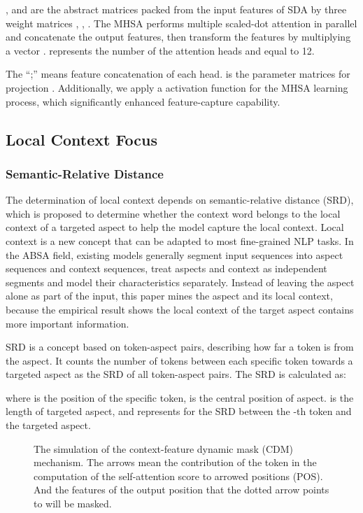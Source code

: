 \documentclass[a4paper,fleqn]{cas-sc}
\begin{document}
,  and  are the abstract matrices packed from the input features of SDA by three weight matrices , , . The MHSA performs multiple scaled-dot attention in parallel and concatenate the output features, then transform the features by multiplying a vector .  represents the number of the attention heads and equal to 12. 

The ``;'' means feature concatenation of each head.  is the parameter matrices for projection . Additionally, we apply a  activation function for the MHSA learning process, which significantly enhanced feature-capture capability.


\subsection{Local Context Focus}

\subsubsection{Semantic-Relative Distance}
\label{sec:SRD}

The determination of local context depends on semantic-relative distance (SRD), which is proposed to determine whether the context word belongs to the local context of a targeted aspect to help the model capture the local context. Local context is a new concept that can be adapted to most fine-grained NLP tasks. In the ABSA field, existing models generally segment input sequences into aspect sequences and context sequences, treat aspects and context as independent segments and model their characteristics separately. Instead of leaving the aspect alone as part of the input, this paper mines the aspect and its local context, because the empirical result shows the local context of the target aspect contains more important information.

SRD is a concept based on token-aspect pairs, describing how far a token is from the aspect. It counts the number of tokens between each specific token towards a targeted aspect as the SRD of all token-aspect pairs. The SRD is calculated as:

where   is the position of the specific token,  is the central position of aspect.  is the length of targeted aspect, and  represents for the SRD between the -th token and the targeted aspect.

\begin{figure*}[pos=h]
	\centering
\caption{The simulation of the context-feature dynamic mask (CDM) mechanism. The arrows mean the contribution of the token in the computation of the self-attention score to arrowed positions (POS). And the features of the output position that the dotted arrow points to will be masked.}
	\label{fig:LCF1}
\end{figure*}
\end{document}
